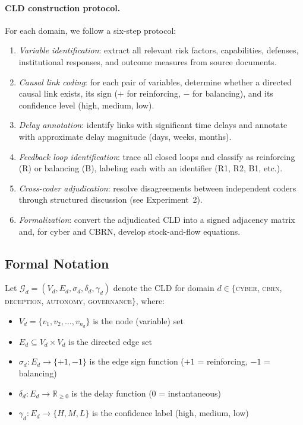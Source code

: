 \documentclass[11pt]{article}
\begin{document}
\paragraph{CLD construction protocol.} For each domain, we follow a six-step protocol:

\begin{enumerate}[leftmargin=2em,itemsep=1pt]
\item \textit{Variable identification}: extract all relevant risk factors, capabilities, defenses, institutional responses, and outcome measures from source documents.
\item \textit{Causal link coding}: for each pair of variables, determine whether a directed causal link exists, its sign ($+$ for reinforcing, $-$ for balancing), and its confidence level (high, medium, low).
\item \textit{Delay annotation}: identify links with significant time delays and annotate with approximate delay magnitude (days, weeks, months).
\item \textit{Feedback loop identification}: trace all closed loops and classify as reinforcing (R) or balancing (B), labeling each with an identifier (R1, R2, B1, etc.).
\item \textit{Cross-coder adjudication}: resolve disagreements between independent coders through structured discussion (see Experiment~2).
\item \textit{Formalization}: convert the adjudicated CLD into a signed adjacency matrix and, for cyber and CBRN, develop stock-and-flow equations.
\end{enumerate}

\subsection{Formal Notation}
\label{sec:notation}

Let $\mathcal{G}_d = (V_d, E_d, \sigma_d, \delta_d, \gamma_d)$ denote the CLD for domain $d \in \{$\textsc{cyber, cbrn, deception, autonomy, governance}$\}$, where:

\begin{itemize}[leftmargin=2em,itemsep=1pt]
\item $V_d = \{v_1, v_2, \ldots, v_{n_d}\}$ is the node (variable) set
\item $E_d \subseteq V_d \times V_d$ is the directed edge set
\item $\sigma_d: E_d \to \{+1, -1\}$ is the edge sign function ($+1$ = reinforcing, $-1$ = balancing)
\item $\delta_d: E_d \to \mathbb{R}_{\geq 0}$ is the delay function (0 = instantaneous)
\item $\gamma_d: E_d \to \{H, M, L\}$ is the confidence label (high, medium, low)
\end{itemize}
\end{document}
